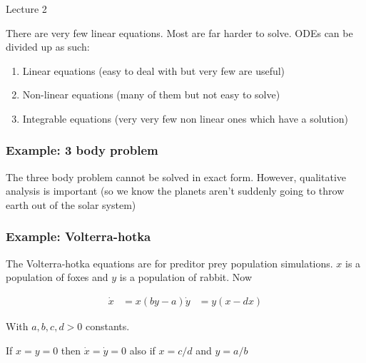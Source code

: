 \begin{center}

Lecture 2

\end{center}

There are very few linear equations. Most are far harder to solve. ODEs can be divided up as such:

\begin{enumerate}

\item Linear equations (easy to deal with but very few are useful)
\item Non-linear equations (many of them but not easy to solve)
\item Integrable equations (very very few non linear ones which have a solution)

\end{enumerate}

\subsubsection*{Example: 3 body problem}

The three body problem cannot be solved in exact form. However, qualitative analysis is important (so we know the planets aren't suddenly going to throw earth out of the solar system)

\subsubsection*{Example: Volterra-hotka}

The Volterra-hotka equations are for preditor prey population simulations. $x$ is a population of foxes and $y$ is a population of rabbit. Now

\begin{align*}
\dot{x} &= x(by-a)
\dot{y} &= y(x-dx)
\end{align*}

With $a,b,c,d>0$ constants.

If $x=y=0$ then $\dot{x} = \dot{y} = 0$ also if $x = c/d$ and $y = a/b$
